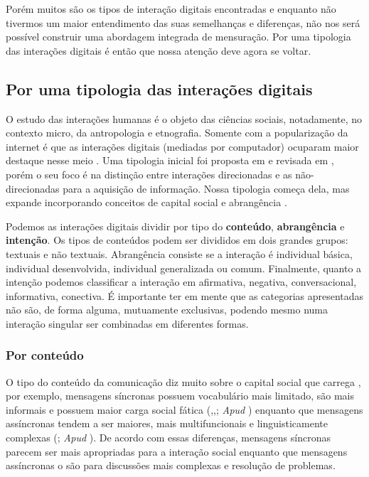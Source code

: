 \documentclass{article}
\begin{document}
Porém muitos são os tipos de interação digitais encontradas e enquanto não
tivermos um maior entendimento das suas semelhanças e diferenças, não nos será
possível construir uma abordagem integrada de mensuração. Por uma tipologia das
interações digitais é então que nossa atenção deve agora se voltar.

\subsection{Por uma tipologia das interações digitais}

O estudo das interações humanas é o objeto das ciências sociais, notadamente, no
contexto micro, da antropologia e etnografia. Somente com a popularização da
internet é que as interações digitais (mediadas por computador) ocuparam maior
destaque nesse meio \cite{Wellman1996}\cite{Herring2002}. Uma tipologia inicial
foi proposta em \cite{Burnett2000} e revisada em \cite{Burnett2004}, porém o
seu foco é na distinção entre interações direcionadas e as não-direcionadas para
a aquisição de informação. Nossa tipologia começa dela, mas expande incorporando
conceitos de capital social \cite{Recuero2008} e abrangência
\cite{MARTINEZ2000}.

Podemos as interações digitais dividir por tipo do \textbf{conteúdo},
\textbf{abrangência} e \textbf{intenção}. Os tipos de conteúdos podem ser
divididos em dois grandes grupos: textuais e não textuais. Abrangência consiste
se a interação é individual básica, individual desenvolvida, individual
generalizada ou comum. Finalmente, quanto a intenção podemos classificar a
interação em afirmativa, negativa, conversacional, informativa, conectiva. É
importante ter em mente que as categorias apresentadas não são, de forma alguma,
mutuamente exclusivas, podendo mesmo numa interação singular ser combinadas em
diferentes formas.

\subsubsection{Por conteúdo}

O tipo do conteúdo da comunicação diz muito sobre o capital social que carrega
\cite{Kim2007}, por exemplo, mensagens síncronas possuem vocabulário mais
limitado, são mais informais e possuem maior carga social fática
(\cite{Danet1998},\cite{Ko1996},\cite{WERRY1996}; \textit{Apud}
\cite{Herring2002}) enquanto que mensagens assíncronas tendem a ser maiores,
mais multifuncionais e linguisticamente complexas (\cite{Herring1999};
\textit{Apud} \cite{Herring2002}). De acordo com essas diferenças, mensagens
síncronas parecem ser mais apropriadas para a interação social enquanto que
mensagens assíncronas o são para discussões mais complexas e resolução de
problemas.
\end{document}
